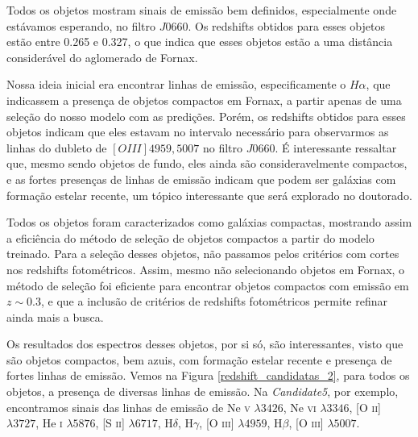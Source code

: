 Todos os objetos mostram sinais de emissão bem definidos, especialmente onde estávamos esperando, no filtro $J0660$. Os redshifts obtidos para esses objetos estão entre 0.265 e 0.327, o que indica que esses objetos estão a uma distância considerável do aglomerado de Fornax.

Nossa ideia inicial era encontrar linhas de emissão, especificamente o $H\alpha$, que indicassem a presença de objetos compactos em Fornax, a partir apenas de uma seleção do nosso modelo com as predições. Porém, os redshifts obtidos para esses objetos indicam que eles estavam no intervalo necessário para observarmos as linhas do dubleto de $[OIII]4959,5007$ no filtro $J0660$. É interessante ressaltar que, mesmo sendo objetos de fundo, eles ainda são consideravelmente compactos, e as fortes presenças de linhas de emissão indicam que podem ser galáxias com formação estelar recente, um tópico interessante que será explorado no doutorado.

Todos os objetos foram caracterizados como galáxias compactas, mostrando assim a eficiência do método de seleção de objetos compactos a partir do modelo treinado. Para a seleção desses objetos, não passamos pelos critérios com cortes nos redshifts fotométricos. Assim, mesmo não selecionando objetos em Fornax, o método de seleção foi eficiente para encontrar objetos compactos com emissão em $z\sim 0.3$, e que a inclusão de critérios de redshifts fotométricos permite refinar ainda mais a busca.


Os resultados dos espectros desses objetos, por si só, são interessantes, visto que são objetos compactos, bem azuis, com formação estelar recente e presença de fortes linhas de emissão. Vemos na Figura \ref{redshift_candidatas_2}, para todos os objetos, a presença de diversas linhas de emissão. Na \textit{Candidate5}, por exemplo, encontramos sinais das linhas de emissão de Ne \textsc{v} $\lambda3426$, Ne \textsc{vi} $\lambda3346$, [O \textsc{ii}] $\lambda3727$, He \textsc{i} $\lambda5876$, [S \textsc{ii}] $\lambda6717$, H$\delta$, H$\gamma$, [O \textsc{iii}] $\lambda4959$, H$\beta$, [O \textsc{iii}] $\lambda5007$.

